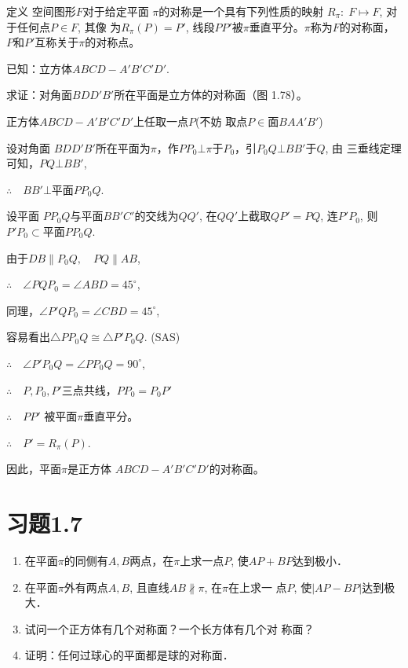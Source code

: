 \begin{blk}
  {定义} 空间图形$F$对于给定平面
$\pi$的对称是一个具有下列性质的映射
$R_{\pi}:\; F\mapsto F$, 对于任何点$P\in F$, 其像
为$R_{\pi}(P)=P'$, 线段$PP'$被$\pi$垂直平分。$\pi$称为$F$的对称面，
$P$和$P'$互称关于$\pi$的对称点。
\end{blk}


\begin{example}
  已知：立方体$ABCD-A' B'C' D'$.

  求证：对角面$BDD'B'$所在平面是立方体的对称面（图
  1.78）。
\end{example}

\begin{solution}
  正方体$ABCD-  A'B'C'D'$上任取一点$P$(不妨
  取点$P\in$面$BAA'B'$) 
  
  设对角面
  $BDD'B'$所在平面为$\pi$，作$PP_0
  \bot \pi$于$P_0$，引$P_0Q\bot BB'$于$Q$, 由
  三垂线定理可知，$PQ\bot BB'$, 

  $\therefore\quad BB'\bot $平面$PP_0Q$.
  
  设平面
  $PP_0Q$与平面$BB'C'$的交线为$QQ'$, 在$QQ'$上截取$QP'=PQ$, 
  连$P'P_0$, 则$P'P_0\subset $平面$PP_0Q$. 
  
  由于$DB\parallel P_0Q,\quad PQ\parallel AB$,

$\therefore\quad \angle PQP_0=\angle ABD=45^{\circ}$, 

同理，$\angle P'QP_0=\angle CBD=45^{\circ}$, 

容易看出$\triangle PP_0Q\cong \triangle P'P_0Q$. (SAS)

$\therefore\quad \angle P'P_0Q=\angle PP_0Q=90^{\circ}$,

$\therefore\quad P,P_0,P'$三点共线，$PP_0=P_0P'$

$\therefore\quad PP'$
  被平面$\pi$垂直平分。
  
  $\therefore\quad P'=R_{\pi}(P)$. 
  
  因此，平面$\pi$是正方体
  $ABCD-A'B'C'D'$的对称面。
\end{solution}


\section*{习题1.7}

\begin{enumerate}
    \item 在平面$\pi$的同侧有$A,B$两点，在$\pi$上求一点$P$, 使$AP+
    BP$达到极小．
    \item 在平面$\pi$外有两点$A,B$, 且直线$AB\nparallel \pi$, 在$\pi$在上求一
    点$P$, 使$|AP-BP|$达到极大．
    \item 试问一个正方体有几个对称面？一个长方体有几个对
    称面？
    \item 证明：任何过球心的平面都是球的对称面．
\end{enumerate}

